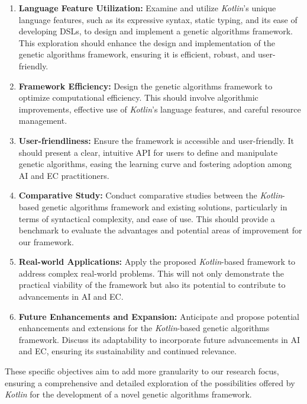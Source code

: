     \begin{enumerate}
      \item \textbf{Language Feature Utilization:} Examine and utilize 
        \textit{Kotlin}'s unique language features, such as its expressive
        syntax, static typing, and its ease of developing DSLs, to design and
        implement a genetic algorithms framework.
        This exploration should enhance the design and implementation of the 
        genetic algorithms framework, ensuring it is efficient, robust, and 
        user-friendly.
      \item \textbf{Framework Efficiency:} Design the genetic algorithms 
        framework to optimize computational efficiency.
        This should involve algorithmic improvements, effective use of 
        \textit{Kotlin}'s language features, and careful resource management.
      \item \textbf{User-friendliness:} Ensure the framework is accessible and 
        user-friendly.
        It should present a clear, intuitive API for users to define and 
        manipulate genetic algorithms, easing the learning curve and fostering 
        adoption among AI and EC practitioners.
      \item \textbf{Comparative Study:} Conduct comparative studies between the 
        \textit{Kotlin}-based genetic algorithms framework and existing 
        solutions, particularly in terms of syntactical complexity, and ease of 
        use.
        This should provide a benchmark to evaluate the advantages and potential 
        areas of improvement for our framework.
      \item \textbf{Real-world Applications:} Apply the proposed 
        \textit{Kotlin}-based framework to address complex real-world problems.
        This will not only demonstrate the practical viability of the framework 
        but also its potential to contribute to advancements in AI and EC.
      \item \textbf{Future Enhancements and Expansion:} Anticipate and propose 
        potential enhancements and extensions for the \textit{Kotlin}-based 
        genetic algorithms framework.
        Discuss its adaptability to incorporate future advancements in AI and EC, ensuring its sustainability and continued relevance.
    \end{enumerate} 
    
    These specific objectives aim to add more granularity to our research focus, 
    ensuring a comprehensive and detailed exploration of the possibilities 
    offered by \textit{Kotlin} for the development of a novel genetic algorithms 
    framework.